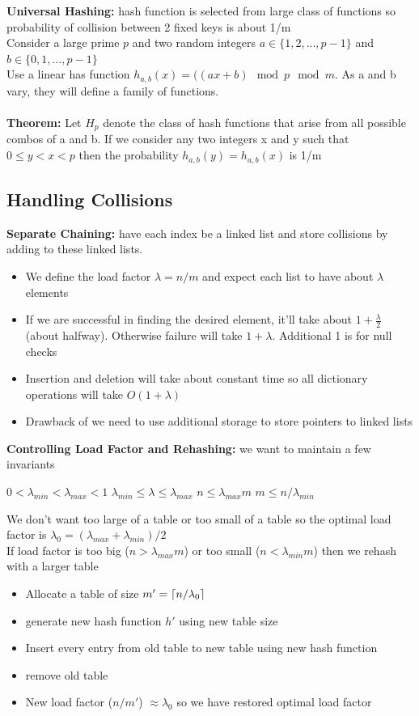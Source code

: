 \documentclass{article}
\DeclarePairedDelimiter{\ceil}{\lceil}{\rceil}
\begin{document}
  \textbf{Universal Hashing: }hash function is selected from large class of functions so probability of collision between 2 fixed keys is about 1/m\\
  Consider a large prime $p$ and two random integers $a \in \{1, 2, ..., p-1\}$ and $b \in \{0, 1, ..., p-1\}$ \\
  Use a linear has function $h_{a,b}(x) = ((ax + b) \mod p \mod m$. As a and b vary, they will define a family of functions.\\ \\
  \textbf{Theorem: }Let $H_{p}$ denote the class of hash functions that arise from all possible combos of a and b. If we consider any two integers x and y such that $0 \leq y < x < p$ then the probability $h_{a,b}(y) = h_{a,b}(x)$ is 1/m
  \subsection{Handling Collisions}
  \textbf{Separate Chaining: }have each index be a linked list and store collisions by adding to these linked lists.
    \begin{itemize}[noitemsep]
    \item We define the load factor $\lambda = n/m$ and expect each list to have about $\lambda$ elements
    \item If we are successful in finding the desired element, it'll take about $1 + \frac{\lambda}{2}$ (about halfway). Otherwise failure will take $1 + \lambda$. Additional 1 is for null checks
    \item Insertion and deletion will take about constant time so all dictionary operations will take $O(1 + \lambda)$
    \item Drawback of we need to use additional storage to store pointers to linked lists
    \end{itemize}
  \textbf{Controlling Load Factor and Rehashing: }we want to maintain a few invariants
  \begin{center} 
    $0 < \lambda_{min} < \lambda_{max} < 1$ \quad $\lambda_{min} \leq \lambda \leq \lambda_{max}$ \quad $n \leq \lambda_{max}m$ \quad $m \leq n/\lambda_{min}$
  \end{center}
  We don't want too large of a table or too small of a table so the optimal load factor is $\lambda_{0} = (\lambda_{max} + \lambda_{min}) / 2$\\
  If load factor is too big ($n > \lambda_{max}m$) or too small ($n < \lambda_{min}m$) then we rehash with a larger table
  \begin{itemize}
    \item Allocate a table of size $m' = \ceil{n/\lambda_{0}}$
    \item generate new hash function $h'$ using new table size
    \item Insert every entry from old table to new table using new hash function
    \item remove old table
    \item New load factor ($n/m'$) $\approx \lambda_{0}$ so we have restored optimal load factor
  \end{itemize}
\end{document}
